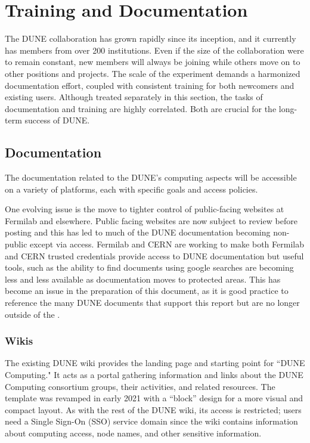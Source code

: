 \documentclass[../main-v1.tex]{subfiles}
\begin{document}
\chapter{Training and Documentation }
\label{ch:train}
The DUNE collaboration has grown rapidly since its inception, and it currently has members from over 200 institutions.  Even if the size of the collaboration were to remain constant, new members will always be joining while others move on to other positions and projects.  The scale of the experiment demands a harmonized documentation effort, coupled with consistent training for both newcomers and existing users. Although treated separately in this section, the tasks of documentation and training are highly correlated. Both are crucial for the long-term success of DUNE. 

\section{Documentation}
The documentation related to the DUNE’s computing aspects will be accessible on a variety of platforms, each with specific goals and access policies.

One evolving issue is the move to tighter control of public-facing websites at Fermilab and elsewhere.  Public facing websites are now subject to review before posting and this has led to much of the DUNE documentation becoming non-public except via  access.   Fermilab and CERN are working to make both Fermilab and CERN trusted credentials provide access to DUNE documentation but useful tools, such as the ability to find documents using google searches are becoming less and less available as documentation moves to protected areas.  This has become an issue in the preparation of this document, as it is good practice to reference the many DUNE documents that support this report but are no longer outside of the . 

\subsection{Wikis}
The existing DUNE wiki %
provides the landing page and starting point for ``DUNE Computing." It acts as a portal gathering information and links about the DUNE Computing consortium groups, %
their activities, and related resources. The template %
was revamped in early 2021 with a ``block'' design for a more visual and compact layout. As with the rest of the DUNE wiki, its access is restricted; users need a  Single Sign-On (SSO) service domain since the wiki contains information about computing access, node names, and other sensitive information. 
\end{document}
